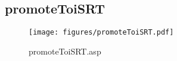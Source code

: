 \subsection{promoteToiSRT}
\begin{figure}[htb]
    \begin{center}
        \texttt{[image: figures/promoteToiSRT.pdf]}
    \end{center}
    \caption{promoteToiSRT.asp}
    \label{fig:promoteToiSRT}
\end{figure}
